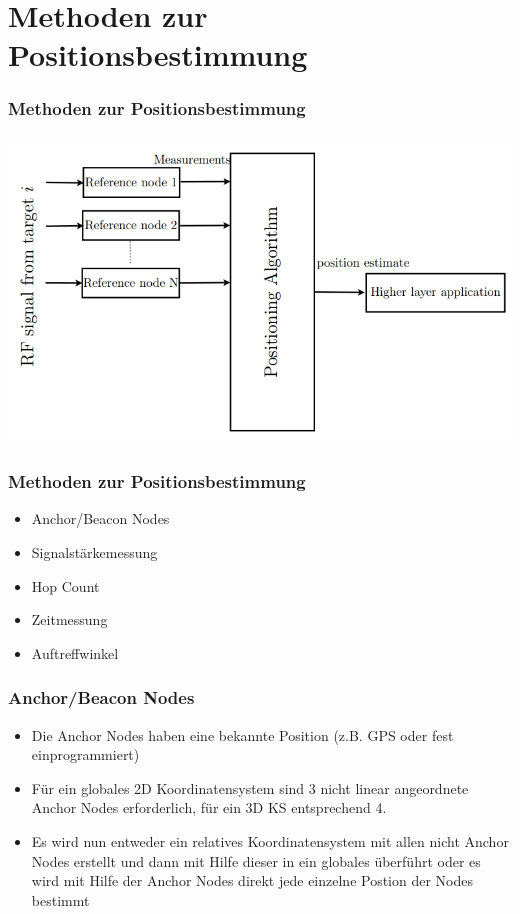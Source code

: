 \section{Methoden zur Positionsbestimmung}
\label{sec:methoden}

\begin{frame}
  \frametitle{Methoden zur Positionsbestimmung}
  \begin{center}
    \includegraphics[scale=0.35]{img/algo_1}
  \end{center}
\end{frame}

\begin{frame}
  \frametitle{Methoden zur Positionsbestimmung}

  \begin{itemize}
  \item Anchor/Beacon Nodes
  \item Signalstärkemessung
  \item Hop Count
  \item Zeitmessung
  \item Auftreffwinkel
  \end{itemize}
\end{frame}

\begin{frame}
  \frametitle{Anchor/Beacon Nodes}

  \begin{itemize}
  \item Die Anchor Nodes haben eine bekannte Position (z.B. GPS oder
    fest einprogrammiert)
  \item Für ein globales 2D Koordinatensystem sind 3 nicht linear
    angeordnete Anchor Nodes erforderlich, für ein 3D KS entsprechend
    4.
  \item Es wird nun entweder ein relatives Koordinatensystem mit allen
    nicht Anchor Nodes erstellt und dann mit Hilfe dieser in ein
    globales überführt oder es wird mit Hilfe der Anchor Nodes direkt
    jede einzelne Postion der Nodes bestimmt
  \end{itemize}
\end{frame}

